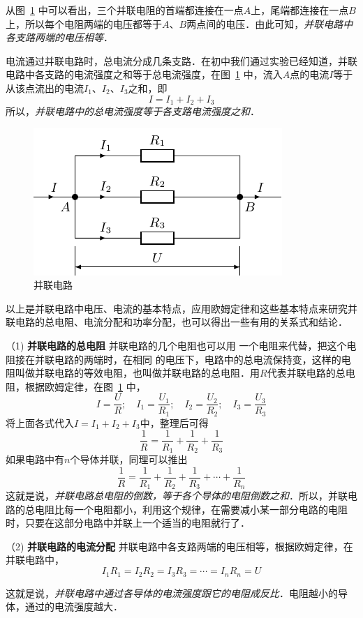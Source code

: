 从图~\ref{fig_B_7-11} 中可以看出，三个并联电阻的首端都连接在一点$A$上，尾端都连接在一点$B$上，所以每个电阻两端的电压都等于$A$、$B$两点间的电压．由此可知，\textit{并联电路中各支路两端的电压相等}．

电流通过并联电路时，总电流分成几条支路．在初中我们通过实验已经知道，并联电路中各支路的电流强度之和等于总电流强度，在图~\ref{fig_B_7-11} 中，流入$A$点的电流$I$等于从该点流出的电流$I_1$、$I_2$、$I_3$之和，即
\[I=I_1+I_2+I_3\]
所以，\textit{并联电路中的总电流强度等于各支路电流强度之和}．
\begin{figure}[htbp]
    \centering
    \includegraphics{fig/B/7-11.pdf}
    \caption{并联电路}\label{fig_B_7-11}
\end{figure}

以上是并联电路中电压、电流的基本特点，应用欧姆定律和这些基本特点来研究并联电路的总电阻、电流分配和功率分配，也可以得出一些有用的关系式和结论．

（1) \textbf{并联电路的总电阻 } 并联电路的几个电阻也可以用
一个电阻来代替，把这个电阻接在并联电路的两端时，在相同
的电压下，电路中的总电流保持变，这样的电阻叫做并联电路的等效电阻，也叫做并联电路的总电阻．用$R$代表并联电路的总电阻，根据欧姆定律，在图~\ref{fig_B_7-11} 中，
\[I=\frac{U}{R};\quad I_1=\frac{U_1}{R_1};\quad I_2=\frac{U_2}{R_2};\quad I_3=\frac{U_3}{R_3}\]
将上面各式代入$I=I_1+I_2+I_3$中，整理后可得
\[\frac{1}{R}=\frac{1}{R_1}+\frac{1}{R_2}+\frac{1}{R_3} \]
如果电路中有$n$个导体并联，同理可以推出
\[\frac{1}{R}=\frac{1}{R_1}+\frac{1}{R_2}+\frac{1}{R_3}+\cdots+\frac{1}{R_n} \]
这就是说，\textit{并联电路总电阻的倒数，等于各个导体的电阻倒数之和}．所以，并联电路的总电阻比每一个电阻都小，利用这个规律，在需要减小某一部分电路的电阻时，只要在这部分电路中并联上一个适当的电阻就行了．

（2) \textbf{并联电路的电流分配 } 并联电路中各支路两端的电压相等，根据欧姆定律，在并联电路中，
\[I_1R_1=I_2R_2=I_3R_3=\cdots=I_nR_n=U \]

这就是说，\textit{并联电路中通过各导体的电流强度跟它的电阻成反比}．电阻越小的导体，通过的电流强度越大．

